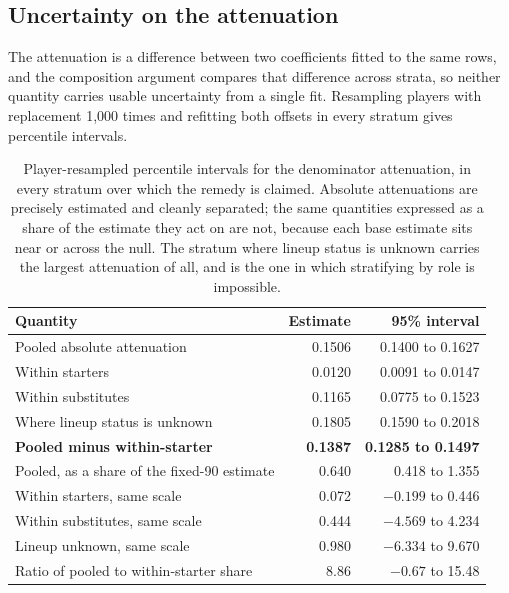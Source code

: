 \documentclass[11pt]{article}
\begin{document}
\subsection*{Uncertainty on the attenuation}

The attenuation is a difference between two coefficients fitted to the same rows, and the composition argument compares that difference across strata, so neither quantity carries usable uncertainty from a single fit. Resampling players with replacement 1,000 times and refitting both offsets in every stratum gives percentile intervals.

\begin{table}[h]
\centering
\caption{Player-resampled percentile intervals for the denominator attenuation, in every stratum over which the remedy is claimed. Absolute attenuations are precisely estimated and cleanly separated; the same quantities expressed as a share of the estimate they act on are not, because each base estimate sits near or across the null. The stratum where lineup status is unknown carries the largest attenuation of all, and is the one in which stratifying by role is impossible.}
\label{tab:supp_attenuation_boot}
\small
\begin{tabular}{lrr}
\toprule
Quantity & Estimate & 95\% interval\\
\midrule
Pooled absolute attenuation & 0.1506 & 0.1400 to 0.1627\\
Within starters & 0.0120 & 0.0091 to 0.0147\\
Within substitutes & 0.1165 & 0.0775 to 0.1523\\
Where lineup status is unknown & 0.1805 & 0.1590 to 0.2018\\
\textbf{Pooled minus within-starter} & \textbf{0.1387} & \textbf{0.1285 to 0.1497}\\
\midrule
Pooled, as a share of the fixed-90 estimate & 0.640 & 0.418 to 1.355\\
Within starters, same scale & 0.072 & $-0.199$ to 0.446\\
Within substitutes, same scale & 0.444 & $-4.569$ to 4.234\\
Lineup unknown, same scale & 0.980 & $-6.334$ to 9.670\\
Ratio of pooled to within-starter share & 8.86 & $-0.67$ to 15.48\\
\bottomrule
\end{tabular}
\end{table}
\end{document}
